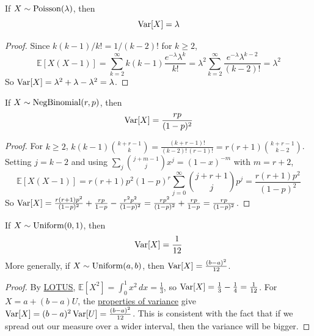   \begin{theorem}
    \label{thm:variance-of-poisson}
    If \hyperref[def:poisson-random-variable]{$X \sim \operatorname{Poisson}(\lambda)$}, then 
    \begin{equation}
      \operatorname{Var}[X] = \lambda
    \end{equation}
  \end{theorem}
  \begin{proof}
    Since $k(k-1)/k! = 1/(k-2)!$ for $k \geq 2$, 
    \begin{equation}
      \mathbb{E}[X(X-1)] = \sum_{k=2}^\infty k(k-1) \frac{e^{-\lambda} \lambda^k}{k!} = \lambda^2 \sum_{k=2}^\infty \frac{e^{-\lambda} \lambda^{k-2}}{(k-2)!} = \lambda^2
    \end{equation}
    So $\operatorname{Var}[X] = \lambda^2 + \lambda - \lambda^2 = \lambda$. 
  \end{proof}

  \begin{theorem}
    \label{thm:variance-of-negative-binomial}
    If \hyperref[def:negative-binomial-distribution]{$X \sim \operatorname{NegBinomial}(r, p)$}, then 
    \begin{equation}
      \operatorname{Var}[X] = \frac{r p}{(1 - p)^2}
    \end{equation}
  \end{theorem}
  \begin{proof}
    For $k \geq 2$, $k(k-1) \binom{k+r-1}{k} = \frac{(k+r-1)!}{(k-2)! \, (r-1)!} = r(r+1) \binom{k+r-1}{k-2}$. Setting $j = k - 2$ and using $\sum_{j} \binom{j+m-1}{j} x^j = (1-x)^{-m}$ with $m = r + 2$, 
    \begin{equation}
      \mathbb{E}[X(X-1)] = r(r+1) p^2 (1-p)^r \sum_{j=0}^\infty \binom{j+r+1}{j} p^j = \frac{r(r+1) p^2}{(1-p)^2}
    \end{equation}
    So $\operatorname{Var}[X] = \frac{r(r+1)p^2}{(1-p)^2} + \frac{rp}{1-p} - \frac{r^2 p^2}{(1-p)^2} = \frac{r p^2}{(1-p)^2} + \frac{rp}{1-p} = \frac{rp}{(1-p)^2}$. 
  \end{proof}

  \begin{theorem}
    \label{thm:variance-of-continuous-uniform}
    If \hyperref[def:uniform-random-variable-2]{$X \sim \operatorname{Uniform}(0, 1)$}, then 
    \begin{equation}
      \operatorname{Var}[X] = \frac{1}{12}
    \end{equation}
    More generally, if $X \sim \operatorname{Uniform}(a, b)$, then $\operatorname{Var}[X] = \frac{(b - a)^2}{12}$. 
  \end{theorem}
  \begin{proof}
    By \hyperref[thm:lotus]{LOTUS}, $\mathbb{E}[X^2] = \int_0^1 x^2 \,dx = \frac{1}{3}$, so $\operatorname{Var}[X] = \frac{1}{3} - \frac{1}{4} = \frac{1}{12}$. For $X = a + (b - a) U$, the \hyperref[thm:properties-of-variance]{properties of variance} give $\operatorname{Var}[X] = (b - a)^2 \operatorname{Var}[U] = \frac{(b-a)^2}{12}$. This is consistent with the fact that if we spread out our measure over a wider interval, then the variance will be bigger. 
  \end{proof}

